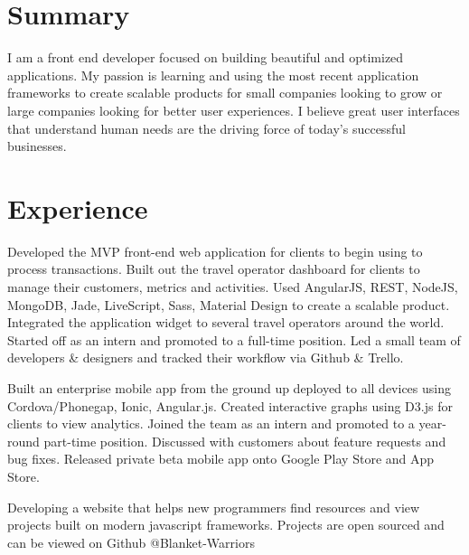 \documentclass[]{deedy-resume-openfont}
\begin{document}
\begin{minipage}[t]{0.64\textwidth} 


\section{Summary}
I am a front end developer focused on building beautiful and optimized applications. My passion is learning and using the most recent application frameworks to create scalable products for small companies looking to grow or large companies looking for better user experiences. I believe great user interfaces that understand human needs are the driving force of today's successful businesses.
\sectionsep


\section{Experience}

\descriptsep
Developed the MVP front-end web application for clients to begin using to process transactions.
Built out the travel operator dashboard for clients to manage their customers, metrics and activities.
Used AngularJS, REST, NodeJS, MongoDB, Jade, LiveScript, Sass, Material Design to create a scalable product. Integrated the application widget to several travel operators around the world. Started off as an intern and promoted to a full-time position. Led a small team of developers \& designers and tracked their workflow via Github \& Trello.
\sectionsep
\sectionsepextra

\descriptsep
Built an enterprise mobile app from the ground up deployed to all devices using Cordova/Phonegap, Ionic, Angular.js. Created interactive graphs using D3.js for clients to view analytics. Joined the team as an intern and promoted to a year-round part-time position. Discussed with customers about feature requests and bug fixes. Released private beta mobile app onto Google Play Store and App Store.
\sectionsep
\sectionsepextra

\descriptsep
Developing a website that helps new programmers find resources and view projects built on modern javascript frameworks. Projects are open sourced and can be viewed on Github @Blanket-Warriors\sectionsep
\sectionsepextra


\end{minipage}
\end{document}
